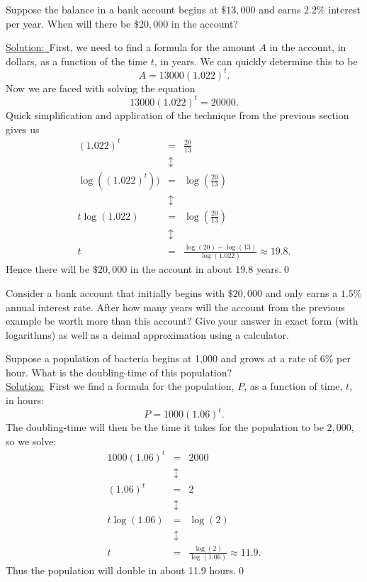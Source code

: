 \begin{eg} Suppose the balance in a bank account begins at $\$13,000$ and earns $2.2\%$ interest per year. When will there be $\$20,000$ in the account?

\par

\underline{Solution:\ }\normalfont First, we need to find a formula for the amount $A$ in the account, in dollars, as a function of the time $t$, in years. We can quickly determine this to be
\[
A = 13000(1.022)^{t}.
\]
Now we are faced with solving the equation
\[
13000(1.022)^t = 20000.
\]
Quick simplification and application of the technique from the previous section gives us
\begin{eqnarray*}
(1.022)^t & =  & \frac{20}{13}\\
& \updownarrow & \\
\log((1.022)^t)) & = & \log\left(\frac{20}{13}\right)\\
& \updownarrow & \\
t\log(1.022) & = &  \log\left(\frac{20}{13}\right)\\
 & \updownarrow & \\
t & = & \frac{\log(20)-\log(13)}{\log(1.022)}\approx 19.8.
\end{eqnarray*}
Hence there will be $\$20,000$ in the account in about 19.8 years.\qed \end{eg}

\par

\begin{question} Consider a bank account that initially begins with $\$20,000$ and only earns a $1.5\%$ annual interest rate. After how many years will the account from the previous example be worth more than this account? Give your answer in exact form (with logarithms) as well as a deimal approximation using a calculator. 
\end{question}

\par

\begin{eg} Suppose a population of bacteria begins at 1,000 and grows at a rate of $6\%$ per hour. What is the doubling-time of this population?\\
\underline{Solution:}\ \normalfont First we find a formula for the population, $P$, as a function of time, $t$, in hours:
\[
P  = 1000(1.06)^t.
\]
The doubling-time will then be the time it takes for the population to be $2,000$, so we solve:
\begin{eqnarray*}
1000(1.06)^t & = & 2000\\
& \updownarrow & \\
(1.06)^t & = & 2\\
& \updownarrow & \\
t\log(1.06) & = & \log(2)\\
& \updownarrow & \\
t & = & \frac{\log(2)}{\log(1.06)}\approx 11.9.
\end{eqnarray*}
Thus the population will double in about 11.9 hours.\qed \end{eg} 

